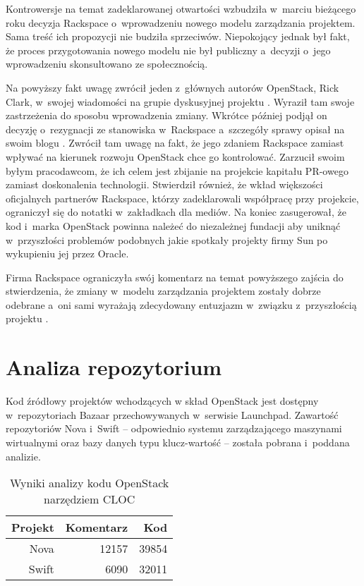 	Kontrowersje na temat zadeklarowanej otwartości wzbudziła w~marciu bieżącego
	roku decyzja Rackspace o~wprowadzeniu nowego modelu zarządzania projektem.
	Sama treść ich propozycji nie budziła sprzeciwów. Niepokojący jednak był
	fakt, że proces przygotowania nowego modelu nie był publiczny a~decyzji
	o~jego wprowadzeniu skonsultowano ze społecznością.

	Na powyższy fakt uwagę zwrócił jeden z~głównych autorów OpenStack, Rick
	Clark, w~swojej wiadomości na grupie dyskusyjnej projektu
	\cite{clark_list_msg}. Wyraził tam swoje zastrzeżenia do sposobu
	wprowadzenia zmiany. Wkrótce później podjął on decyzję o~rezygnacji ze
	stanowiska w~Rackspace a~szczegóły sprawy opisał na swoim blogu
	\cite{why_i_left_rackspace}. Zwrócił tam uwagę na fakt, że jego zdaniem
	Rackspace zamiast wpływać na kierunek rozwoju OpenStack chce go kontrolować.
	Zarzucił swoim byłym pracodawcom, że ich celem jest zbijanie na projekcie
	kapitału PR-owego zamiast doskonalenia technologii. Stwierdził również, że
	wkład większości oficjalnych partnerów Rackspace, którzy zadeklarowali
	współpracę przy projekcie, ograniczył się do notatki w~zakładkach dla
	mediów. Na koniec zasugerował, że kod i~marka OpenStack powinna należeć do
	niezależnej fundacji aby uniknąć w~przyszłości problemów podobnych jakie
	spotkały projekty firmy Sun po wykupieniu jej przez Oracle.

	Firma Rackspace ograniczyła swój komentarz na temat powyższego zajścia do
	stwierdzenia, że zmiany w~modelu zarządzania projektem zostały dobrze
	odebrane a~oni sami wyrażają zdecydowany entuzjazm w~związku z~przyszłością
	projektu \cite{concerns_about_openness}.

	\section{Analiza repozytorium}

	Kod źródłowy projektów wchodzących w skład OpenStack jest dostępny
	w~repozytoriach Bazaar przechowywanych w~serwisie Launchpad. Zawartość
	repozytoriów Nova i~Swift -- odpowiednio systemu zarządzającego maszynami
	wirtualnymi oraz bazy danych typu klucz-wartość -- została pobrana i~poddana
	analizie.

	\begin{table}
		\centering
		\begin{tabular}{|r|r|r|}
			\hline
			\bf Projekt & \bf Komentarz & \phantom{asdf} \bf Kod \\
			\hline
			Nova & 12157 & 39854 \\
			Swift & 6090 & 32011 \\
			\hline
		\end{tabular}
		\caption{Wyniki analizy kodu OpenStack narzędziem CLOC}
		\label{tab:cloc}
	\end{table}

